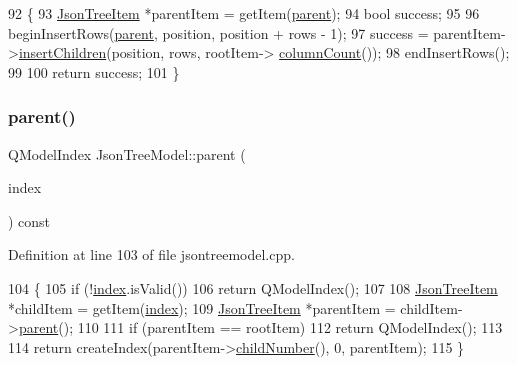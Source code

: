 \begin{DoxyCode}
92 \{
93     \hyperlink{class_json_tree_item}{JsonTreeItem} *parentItem = getItem(\hyperlink{class_json_tree_model_aea54120cdf66d49e8f0ad176eed8fc99}{parent});
94     \textcolor{keywordtype}{bool} success;
95 
96     beginInsertRows(\hyperlink{class_json_tree_model_aea54120cdf66d49e8f0ad176eed8fc99}{parent}, position, position + rows - 1);
97     success = parentItem->\hyperlink{class_json_tree_item_a890a0b7cf4aabcaa43e0726d672ba34a}{insertChildren}(position, rows, rootItem->
      \hyperlink{class_json_tree_item_ad66ee4ac09255aa32fb05ffbd4057413}{columnCount}());
98     endInsertRows();
99 
100     \textcolor{keywordflow}{return} success;
101 \}
\end{DoxyCode}
\mbox{\label{class_json_tree_model_aea54120cdf66d49e8f0ad176eed8fc99}} 
\subsubsection{\texorpdfstring{parent()}{parent()}}
{\footnotesize\ttfamily Q\+Model\+Index Json\+Tree\+Model\+::parent (\begin{DoxyParamCaption}\item[{const Q\+Model\+Index \&}]{index }\end{DoxyParamCaption}) const}



Definition at line 103 of file jsontreemodel.\+cpp.


\begin{DoxyCode}
104 \{
105     \textcolor{keywordflow}{if} (!\hyperlink{class_json_tree_model_ac8be89cc178ef5151479be23006d18e3}{index}.isValid())
106         \textcolor{keywordflow}{return} QModelIndex();
107 
108     \hyperlink{class_json_tree_item}{JsonTreeItem} *childItem = getItem(\hyperlink{class_json_tree_model_ac8be89cc178ef5151479be23006d18e3}{index});
109     \hyperlink{class_json_tree_item}{JsonTreeItem} *parentItem = childItem->\hyperlink{class_json_tree_item_a1777c30033cacb28a800b34423dcee38}{parent}();
110 
111     \textcolor{keywordflow}{if} (parentItem == rootItem)
112         \textcolor{keywordflow}{return} QModelIndex();
113 
114     \textcolor{keywordflow}{return} createIndex(parentItem->\hyperlink{class_json_tree_item_a39c277f6a181ec177b483b38e97e70d5}{childNumber}(), 0, parentItem);
115 \}
\end{DoxyCode}
\mbox{\label{class_json_tree_model_a238f7748e25bf703b09775e7a1f97609}} 
